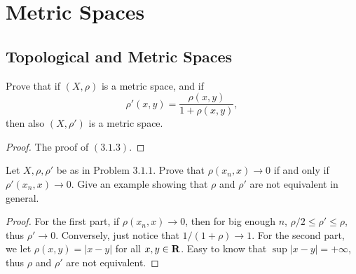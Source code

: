 \chapter{Metric Spaces}

\section{Topological and Metric Spaces}
\begin{pro}%
	Prove that if $(X,\rho)$ is a metric space, and if 
	\[\rho'(x,y)=\frac{\rho(x,y)}{1+\rho(x,y)},\]
	then also $(X,\rho')$ is a metric space.
\end{pro}
\begin{proof}
	The proof of $(3.1.3)$.
\end{proof}

\begin{pro}%
	Let $X,\rho,\rho'$ be as in Problem $3.1.1$. Prove that $\rho(x_n,x)\to 0$ if and only if $\rho'(x_n,x)\to 0$. Give an example showing that $\rho$ and $\rho'$ are not equivalent in general.
\end{pro}
\begin{proof}
	For the first part, if $\rho(x_n,x)\to 0$, then for big enough $n$, $\rho/2 \leq \rho'\leq \rho$, thus $\rho'\to 0$. Conversely, just notice that $1/(1+\rho)\to 1$. For the second part, we let $\rho(x,y)=|x-y|$ for all $x,y\in\mathbf{R}$. Easy to know that $\sup|x-y|=+\infty$, thus $\rho$ and $\rho'$ are not equivalent.
\end{proof}

